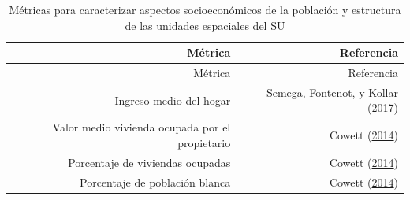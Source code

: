 \documentclass[12pt,a4paper,oneside, openany]{book}
\theoremstyle{definition}
\theoremstyle{definition}
\theoremstyle{definition}
\theoremstyle{remark}
\begin{document}
\begin{longtable}[]{@{}rr@{}}
\caption{\label{tab:ind-SoEc} Métricas para caracterizar aspectos
socioeconómicos de la población y estructura de las unidades espaciales
del SU}\tabularnewline
\toprule
\begin{minipage}[b]{0.57\columnwidth}\raggedleft\strut
Métrica\strut
\end{minipage} & \begin{minipage}[b]{0.31\columnwidth}\raggedleft\strut
Referencia\strut
\end{minipage}\tabularnewline
\midrule
\endfirsthead
\toprule
\begin{minipage}[b]{0.57\columnwidth}\raggedleft\strut
Métrica\strut
\end{minipage} & \begin{minipage}[b]{0.31\columnwidth}\raggedleft\strut
Referencia\strut
\end{minipage}\tabularnewline
\midrule
\endhead
\begin{minipage}[t]{0.57\columnwidth}\raggedleft\strut
Ingreso medio del hogar\strut
\end{minipage} & \begin{minipage}[t]{0.31\columnwidth}\raggedleft\strut
Semega, Fontenot, y Kollar
(\protect\hyperlink{ref-semega2017income}{2017})\strut
\end{minipage}\tabularnewline
\begin{minipage}[t]{0.57\columnwidth}\raggedleft\strut
Valor medio vivienda ocupada por el propietario\strut
\end{minipage} & \begin{minipage}[t]{0.31\columnwidth}\raggedleft\strut
Cowett (\protect\hyperlink{ref-cowett_methodology_2014}{2014})\strut
\end{minipage}\tabularnewline
\begin{minipage}[t]{0.57\columnwidth}\raggedleft\strut
Porcentaje de viviendas ocupadas\strut
\end{minipage} & \begin{minipage}[t]{0.31\columnwidth}\raggedleft\strut
Cowett (\protect\hyperlink{ref-cowett_methodology_2014}{2014})\strut
\end{minipage}\tabularnewline
\begin{minipage}[t]{0.57\columnwidth}\raggedleft\strut
Porcentaje de población blanca\strut
\end{minipage} & \begin{minipage}[t]{0.31\columnwidth}\raggedleft\strut
Cowett (\protect\hyperlink{ref-cowett_methodology_2014}{2014})\strut

\end{minipage}
\end{longtable}
\end{document}
